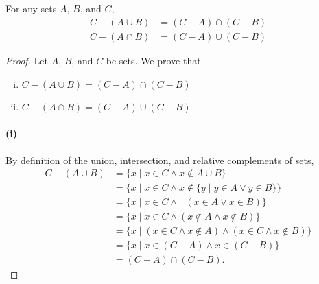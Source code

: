 \documentclass{report}
\begin{document}
\subsection{}%
\label{sub:de-morgans-laws}

For any sets $A$, $B$, and $C$,
  \begin{align*}
    C - (A \cup B) & = (C - A) \cap (C - B) \\
    C - (A \cap B) & = (C - A) \cup (C - B)
  \end{align*}

\begin{proof}

  \statementpadding



  \noindent Let $A$, $B$, and $C$ be sets.
  We prove that
    \begin{enumerate}[(i)]
      \item $C - (A \cup B) = (C - A) \cap (C - B)$
      \item $C - (A \cap B) = (C - A) \cup (C - B)$
    \end{enumerate}

  \paragraph{(i)}%

    By definition of the union, intersection, and relative complements of sets,
      \begin{align*}
        C - (A \cup B)
          & = \{ x \mid x \in C \land x \not\in A \cup B \} \\
          & = \{ x \mid x \in C \land
                        x \not\in \{ y \mid y \in A \lor y \in B \}\} \\
          & = \{ x \mid x \in C \land \neg(x \in A \lor x \in B) \} \\
          & = \{ x \mid x \in C \land (x \not\in A \land x \not\in B) \} \\
          & = \{ x \mid (x \in C \land x \not\in A) \land
                        (x \in C \land x \not\in B) \} \\
          & = \{ x \mid x \in (C - A) \land x \in (C - B) \} \\
          & = (C - A) \cap (C - B).
      \end{align*}


\end{proof}
\end{document}

